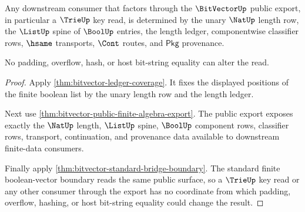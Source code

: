 \begin{theorem}
\label{thm:bitvector-fixed-length-consumer-determinacy}
Any downstream consumer that factors through the $\BitVectorUp$ public export,
in particular a $\TrieUp$ key read, is determined by the unary $\NatUp$ length
row, the $\ListUp$ spine of $\BoolUp$ entries, the length ledger,
componentwise classifier rows, $\hsame$ transports, $\Cont$ routes, and
$\mathsf{Pkg}$ provenance.

No padding, overflow, hash, or host bit-string equality can alter the read.
\end{theorem}
\begin{proof}
Apply \autoref{thm:bitvector-ledger-coverage}. It fixes the displayed positions
of the finite boolean list by the unary length row and the length ledger.

Next use \autoref{thm:bitvector-public-finite-algebra-export}. The public
export exposes exactly the $\NatUp$ length, $\ListUp$ spine, $\BoolUp$
component rows, classifier rows, transport, continuation, and provenance data
available to downstream finite-data consumers.

Finally apply \autoref{thm:bitvector-standard-bridge-boundary}. The standard
finite boolean-vector boundary reads the same public surface, so a $\TrieUp$
key read or any other consumer through the export has no coordinate from which
padding, overflow, hashing, or host bit-string equality could change the result.
\end{proof}

